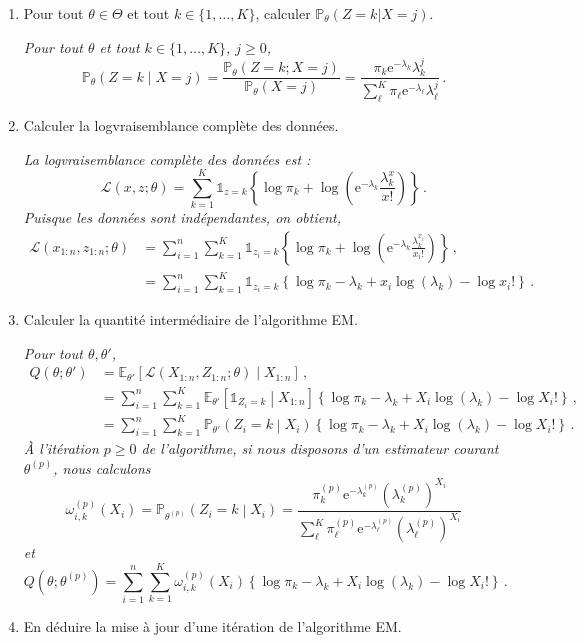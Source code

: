 \documentclass[a4paper,10pt,fleqn]{article}
\newcommand{\1}{\ensuremath{\mathbbm{1}}}
\begin{document}
\begin{enumerate}
\begin{enumerate}
\item Pour tout $\theta\in\Theta$ et tout $k\in\{1,\ldots,K\}$, calculer $\mathbb{P}_\theta(Z=k|X=j)$.

\vspace{.2cm}

{\em
Pour tout $\theta$ et tout $k\in\{1,\ldots,K\}$, $j\geq 0$,
$$
\mathbb{P}_\theta\left(Z=k\middle|X=j\right) = \frac{\mathbb{P}_\theta\left(Z=k;X=j\right)}{\mathbb{P}_\theta\left(X=j\right)} = \frac{\pi_k \mathrm{e}^{-\lambda_k}\lambda_k^{j}}{\sum_{\ell}^K\pi_\ell \mathrm{e}^{-\lambda_\ell}\lambda_\ell^{j}}\,.
$$}
\item Calculer la logvraisemblance compl\`ete des donn\'ees.

\vspace{.2cm}

{\em La logvraisemblance compl\`ete des donn\'ees est :
$$
\mathcal{L}(x,z;\theta) = \sum_{k=1}^K \mathds{1}_{z=k}\left\{\log \pi_k + \log \left(\mathrm{e}^{-\lambda_k}\frac{\lambda_k^{x}}{x!}\right)\right\}\,.
$$
Puisque les donn\'ees sont ind\'ependantes, on obtient,
\begin{align*}
\mathcal{L}(x_{1:n},z_{1:n};\theta) &= \sum_{i=1}^n\sum_{k=1}^K \mathds{1}_{z_i=k}\left\{\log \pi_k + \log \left(\mathrm{e}^{-\lambda_k}\frac{\lambda_k^{x_i}}{x_i!}\right)\right\}\,,\\
&=\sum_{i=1}^n\sum_{k=1}^K \mathds{1}_{z_i=k}\left\{\log \pi_k - \lambda_k+ x_i\log \left(\lambda_k\right) - \log x_i!\right\}\,.
\end{align*}}
\item  Calculer la quantit\'e interm\'ediaire de l'algorithme EM.

\vspace{.2cm}

{\em Pour tout $\theta, \theta'$,
\begin{align*}
Q(\theta;\theta') &= \mathbb{E}_{\theta'}\left[\mathcal{L}(X_{1:n},Z_{1:n};\theta)\middle|X_{1:n}\right] \,,\\
&= \sum_{i=1}^n\sum_{k=1}^K \mathbb{E}_{\theta'}\left[\mathds{1}_{Z_i=k}\middle|X_{1:n}\right]\left\{\log \pi_k - \lambda_k+ X_i\log \left(\lambda_k\right) - \log X_i!\right\}\,,\\
&= \sum_{i=1}^n\sum_{k=1}^K \mathbb{P}_{\theta'}\left(Z_i=k\middle|X_{i}\right)\left\{\log \pi_k - \lambda_k+ X_i\log \left(\lambda_k\right) - \log X_i!\right\}\,.
\end{align*}
\`A l'it\'eration $p\geq 0$ de l'algorithme, si nous disposons d'un estimateur courant $\theta^{(p)}$, nous calculons
$$
\omega_{i,k}^{(p)}(X_i) = \mathbb{P}_{\theta^{(p)}}\left(Z_i=k\middle|X_{i}\right) = \frac{\pi^{(p)}_k \mathrm{e}^{-\lambda^{(p)}_k}(\lambda^{(p)}_k)^{X_i}}{\sum_{\ell}^K\pi^{(p)}_\ell \mathrm{e}^{-\lambda^{(p)}_\ell}(\lambda^{(p)}_\ell)^{X_i}}
$$
et 
$$
Q(\theta;\theta^{(p)}) = \sum_{i=1}^n\sum_{k=1}^K \omega_{i,k}^{(p)}(X_i) \left\{\log \pi_k - \lambda_k+ X_i\log \left(\lambda_k\right) - \log X_i!\right\}\,.
$$}
\item En d\'eduire la mise \`a jour d'une it\'eration de l'algorithme EM.


\end{enumerate}
\end{enumerate}
\end{document}
